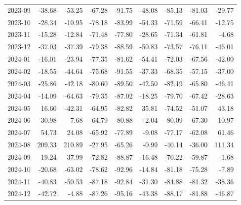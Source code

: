 \begin{table}[ht]
\begin{tabular}{lrrrrrrrr}
  2023-09 & -38.68 & -53.25 & -67.28 & -91.75 & -48.08 & -85.13 & -81.03 & -29.77 \\ 
  2023-10 & -28.34 & -10.95 & -78.18 & -83.99 & -54.33 & -71.59 & -66.41 & -12.75 \\ 
  2023-11 & -15.28 & -12.84 & -71.48 & -77.80 & -28.65 & -71.34 & -61.81 & -4.68 \\ 
  2023-12 & -37.03 & -37.39 & -79.38 & -88.59 & -50.83 & -73.57 & -76.11 & -46.01 \\ 
  2024-01 & -16.01 & -23.94 & -77.35 & -81.62 & -54.41 & -72.03 & -67.56 & -42.00 \\ 
  2024-02 & -18.55 & -44.64 & -75.68 & -91.55 & -37.33 & -68.35 & -57.15 & -37.00 \\ 
  2024-03 & -25.86 & -42.18 & -80.60 & -89.50 & -42.50 & -82.19 & -65.80 & -46.41 \\ 
  2024-04 & -14.09 & -64.63 & -79.35 & -87.02 & -18.25 & -79.70 & -67.42 & -28.63 \\ 
  2024-05 & 16.60 & -42.31 & -64.95 & -82.82 & 35.81 & -74.52 & -51.07 & 43.18 \\ 
  2024-06 & 30.98 & 7.68 & -64.79 & -80.88 & -2.04 & -80.09 & -67.30 & 10.97 \\ 
  2024-07 & 54.73 & 24.08 & -65.92 & -77.89 & -9.08 & -77.17 & -62.08 & 61.46 \\ 
  2024-08 & 209.33 & 210.89 & -27.95 & -65.26 & -0.99 & -40.14 & -36.00 & 111.34 \\ 
  2024-09 & 19.24 & 37.99 & -72.82 & -88.87 & -16.48 & -70.22 & -59.87 & -1.68 \\ 
  2024-10 & -20.68 & -63.02 & -78.62 & -92.96 & -14.84 & -81.18 & -75.28 & -7.89 \\ 
  2024-11 & -40.83 & -50.53 & -87.18 & -92.84 & -31.30 & -84.88 & -81.32 & -38.36 \\ 
  2024-12 & -42.72 & -4.88 & -87.26 & -95.16 & -43.38 & -88.17 & -81.88 & -46.87 \\ 
   \hline
\end{tabular}
\end{table}

